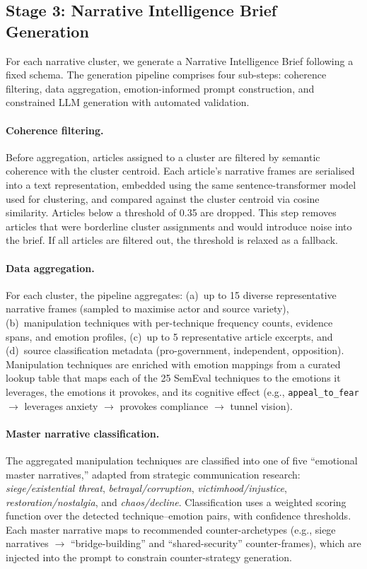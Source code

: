 \documentclass[10pt, a4paper]{article}
\begin{document}
\subsection{Stage 3: Narrative Intelligence Brief Generation}
\label{sec:briefs}

For each narrative cluster, we generate a Narrative Intelligence Brief following a fixed schema. The generation pipeline comprises four sub-steps: coherence filtering, data aggregation, emotion-informed prompt construction, and constrained LLM generation with automated validation.

\paragraph{Coherence filtering.}
Before aggregation, articles assigned to a cluster are filtered by semantic coherence with the cluster centroid. Each article's narrative frames are serialised into a text representation, embedded using the same sentence-transformer model used for clustering, and compared against the cluster centroid via cosine similarity. Articles below a threshold of 0.35 are dropped. This step removes articles that were borderline cluster assignments and would introduce noise into the brief. If all articles are filtered out, the threshold is relaxed as a fallback.

\paragraph{Data aggregation.}
For each cluster, the pipeline aggregates: (a)~up to 15 diverse representative narrative frames (sampled to maximise actor and source variety), (b)~manipulation techniques with per-technique frequency counts, evidence spans, and emotion profiles, (c)~up to 5 representative article excerpts, and (d)~source classification metadata (pro-government, independent, opposition). Manipulation techniques are enriched with emotion mappings from a curated lookup table that maps each of the 25 SemEval techniques to the emotions it leverages, the emotions it provokes, and its cognitive effect (e.g., \texttt{appeal\_to\_fear} $\rightarrow$ leverages anxiety $\rightarrow$ provokes compliance $\rightarrow$ tunnel vision).

\paragraph{Master narrative classification.}
The aggregated manipulation techniques are classified into one of five ``emotional master narratives,'' adapted from strategic communication research: \textit{siege/existential threat}, \textit{betrayal/corruption}, \textit{victimhood/injustice}, \textit{restoration/nostalgia}, and \textit{chaos/decline}. Classification uses a weighted scoring function over the detected technique--emotion pairs, with confidence thresholds. Each master narrative maps to recommended counter-archetypes (e.g., siege narratives $\rightarrow$ ``bridge-building'' and ``shared-security'' counter-frames), which are injected into the prompt to constrain counter-strategy generation.
\end{document}
